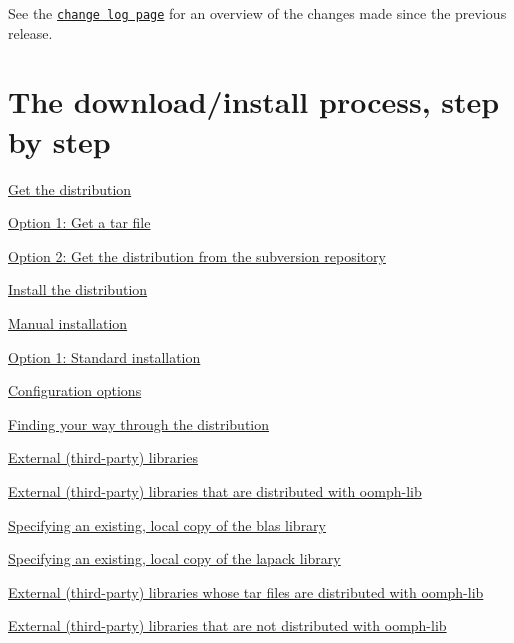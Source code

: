 

See the \href{../../change_log/html/index.html}{\tt change log page} for an overview of the changes made since the previous release.\hypertarget{index_instructions}{}\section{The download/install process, step by step}\label{index_instructions}

\begin{DoxyEnumerate}
\item \hyperlink{index_download}{Get the distribution}
\begin{DoxyEnumerate}
\item \hyperlink{index_tar_file}{Option 1\+: Get a tar file}
\item \hyperlink{index_subversion}{Option 2\+: Get the distribution from the subversion repository}
\end{DoxyEnumerate}
\item \hyperlink{index_install}{Install the distribution}
\begin{DoxyEnumerate}
\item \hyperlink{index_manual_install}{Manual installation}
\item \hyperlink{index_standard_install}{Option 1\+: Standard installation}
\item \hyperlink{index_custom_install}{Configuration options}
\end{DoxyEnumerate}
\item \hyperlink{index_nav}{Finding your way through the distribution}
\item \hyperlink{index_external}{External (third-\/party) libraries}
\begin{DoxyEnumerate}
\item \hyperlink{index_external_src}{External (third-\/party) libraries that are distributed with oomph-\/lib}
\begin{DoxyEnumerate}
\item \hyperlink{index_blas}{Specifying an existing, local copy of the blas library}
\item \hyperlink{index_lapack}{Specifying an existing, local copy of the lapack library}
\end{DoxyEnumerate}
\item \hyperlink{index_external_dist_cgal_etc}{External (third-\/party) libraries whose tar files are distributed with oomph-\/lib}
\item \hyperlink{index_external_dist}{External (third-\/party) libraries that are not distributed with oomph-\/lib}

\end{DoxyEnumerate}
\end{DoxyEnumerate}
